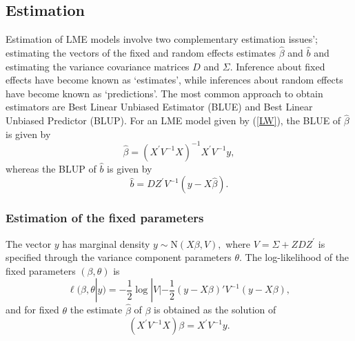 \documentclass[MAIN.tex]{subfiles}
\begin{document}



\subsection{Estimation}
Estimation of LME models involve two complementary estimation issues'; estimating the vectors of the fixed and random effects estimates $\hat{\beta}$ and $\hat{b}$ and estimating the variance covariance matrices $D$ and $\Sigma$.
Inference about fixed effects have become known as `estimates', while inferences about random effects have become known as `predictions'. The most common approach to obtain estimators are Best Linear Unbiased Estimator (BLUE) and Best Linear Unbiased Predictor (BLUP). For an LME model given by (\ref{LW}), the BLUE of $\hat{\beta}$ is given by
\[\hat{\beta} = (X^\prime V^{-1}X)^{-1}X^\prime V^{-1}y,\]whereas the BLUP of $\hat{b}$ is given by
\[\hat{b} = DZ^{\prime} V^{-1} (y-X\hat{\beta}).\]



\subsubsection{Estimation of the fixed parameters}

The vector $y$ has marginal density $y \sim \mathrm{N}(X \beta,V),$ where $V = \Sigma + ZDZ^\prime$ is specified through the variance component parameters $\theta.$ The log-likelihood of the fixed parameters $(\beta, \theta)$ is
\begin{equation}
\ell (\beta, \theta|y) =
-\frac{1}{2} \log |V| -\frac{1}{2}(y -
X \beta)'V^{-1}(y -
X \beta), \label{Likelihood:MarginalModel}
\end{equation}
and for fixed $\theta$ the estimate $\hat{\beta}$ of $\beta$ is obtained as the solution of
\begin{equation}
(X^\prime V^{-1}X) {\beta} = X^\prime V^{-1}y.
\label{mle:beta:hat}
\end{equation}
\end{document}
